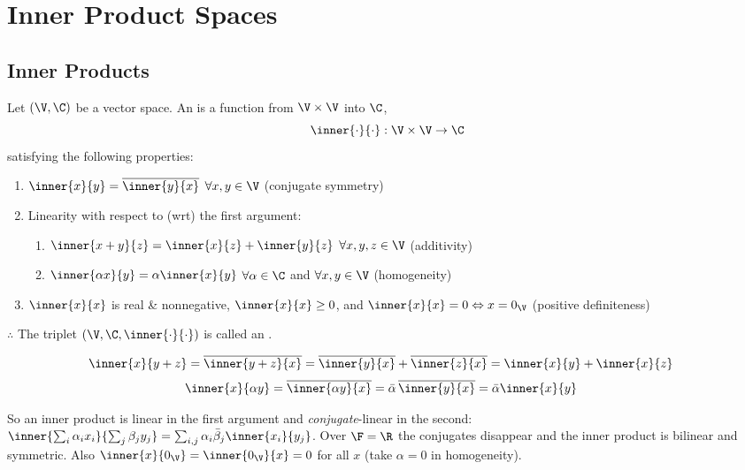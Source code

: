 \section{Inner Product Spaces}\label{sec:ips}
\subsection{Inner Products}\label{ss:inner-products}
\begin{definition}
Let $(\V,\C)$ be a vector space. An  is a function from $\V\times\V$ into $\C$,
\[
\inner{\cdot}{\cdot} : \V\times\V\to\C
\]
satisfying the following properties:
\begin{enumerate}[label=\arabic*)]
\item $\inner{x}{y} = \overline{\inner{y}{x}}$ \quad $\forall x,y\in\V$ \hfill (conjugate symmetry)
\item Linearity with respect to (wrt) the first argument:
  \begin{enumerate}[label=\alph*)]
  \item $\inner{x+y}{z} = \inner{x}{z} + \inner{y}{z}$ \quad $\forall x,y,z\in\V$ \hfill (additivity)
  \item $\inner{\alpha x}{y} = \alpha\inner{x}{y}$ \quad $\forall\alpha\in\C$ and $\forall x,y\in\V$ \hfill (homogeneity)
  \end{enumerate}
\item $\inner{x}{x}$ is real \& nonnegative, $\inner{x}{x}\ge 0$, and
  $\inner{x}{x} = 0 \Leftrightarrow x = 0_{\V}$ \hfill (positive definiteness)
\end{enumerate}
$\therefore$ The triplet $(\V,\C,\inner{\cdot}{\cdot})$ is called an .
\end{definition}
\begin{align*}
\inner{x}{y+z} &= \overline{\inner{y+z}{x}} = \overline{\inner{y}{x}} + \overline{\inner{z}{x}} = \inner{x}{y} + \inner{x}{z}
\end{align*}
\begin{align*}
\inner{x}{\alpha y} &= \overline{\inner{\alpha y}{x}} = \bar\alpha\,\overline{\inner{y}{x}} = \bar\alpha\inner{x}{y}
\end{align*}
\begin{insight}
So an inner product is linear in the first argument and \emph{conjugate}-linear in the second:
$\inner{\textstyle\sum_i\alpha_i x_i}{\sum_j\beta_j y_j} = \sum_{i,j}\alpha_i\bar\beta_j\inner{x_i}{y_j}$.
Over $\F=\R$ the conjugates disappear and the inner product is bilinear and symmetric. Also $\inner{x}{0_\V} = \inner{0_\V}{x} = 0$ for all $x$ (take $\alpha = 0$ in homogeneity).
\end{insight}

